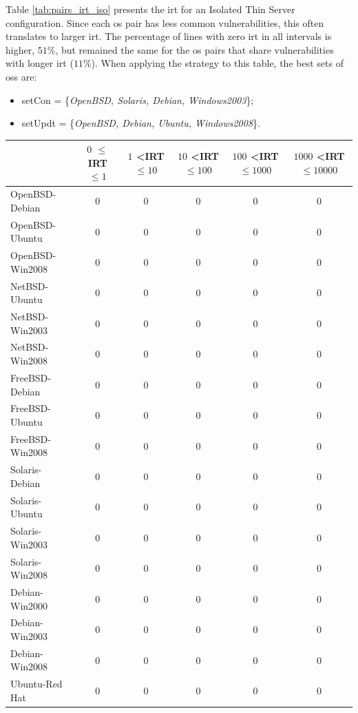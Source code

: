 Table \ref{tab:pairs_irt_iso} presents the \gls{irt} for an Isolated Thin Server configuration. 
Since each \gls{os} pair has less common vulnerabilities, this often translates to larger \gls{irt}.  
The percentage of lines with zero \gls{irt} in all intervals is higher, $51\%$, but remained the same for the \gls{os} pairs that share vulnerabilities with longer \gls{irt} ($11\%$). 
When applying the strategy to this table, the best sets of \glspl{os} are: 

\begin{itemize}
\item setCon = \{\emph{OpenBSD, Solaris, Debian, Windows2003}\};
\item setUpdt = \{\emph{OpenBSD, Debian, Ubuntu, Windows2008}\}.
\end{itemize}


\begin{table}[!ht]
\begin{center}
{\scriptsize
\begin{tabular}{|l||c c c c c|}\hline
&	$0$ $\leq$ IRT $\leq 1$	& $1$ \textless IRT $\leq 10$ & $10$ \textless IRT $\leq 100$ & $100$ \textless IRT $\leq 1000$ & $1000$ \textless IRT $\leq 10000$\\\hline
OpenBSD-Debian & 0 & 0 & 0 & 0 & 0 \\
OpenBSD-Ubuntu & 0 & 0 & 0 & 0 & 0 \\
OpenBSD-Win2008 & 0 & 0 & 0 & 0 & 0 \\
NetBSD-Ubuntu & 0 & 0 & 0 & 0 & 0 \\
NetBSD-Win2003 & 0 & 0 & 0 & 0 & 0 \\
NetBSD-Win2008 & 0 & 0 & 0 & 0 & 0 \\
FreeBSD-Debian & 0 & 0 & 0 & 0 & 0 \\
FreeBSD-Ubuntu & 0 & 0 & 0 & 0 & 0 \\
FreeBSD-Win2008 & 0 & 0 & 0 & 0 & 0 \\
Solaris-Debian & 0 & 0 & 0 & 0 & 0 \\
Solaris-Ubuntu & 0 & 0 & 0 & 0 & 0 \\
Solaris-Win2003 & 0 & 0 & 0 & 0 & 0 \\
Solaris-Win2008 & 0 & 0 & 0 & 0 & 0 \\
Debian-Win2000 & 0 & 0 & 0 & 0 & 0 \\
Debian-Win2003 & 0 & 0 & 0 & 0 & 0 \\
Debian-Win2008 & 0 & 0 & 0 & 0 & 0 \\
Ubuntu-Red Hat & 0 & 0 & 0 & 0 & 0 \\

\end{tabular}}
\end{center}
\end{table}
